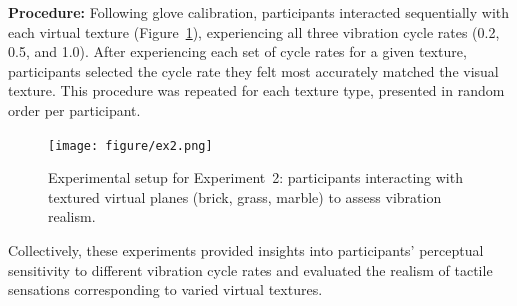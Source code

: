 \documentclass[graybox]{svmult}
\begin{document}
\textbf{Procedure:} Following glove calibration, participants interacted sequentially with each virtual texture (Figure~\ref{fig:experiment2_setup}), experiencing all three vibration cycle rates (0.2, 0.5, and 1.0). After experiencing each set of cycle rates for a given texture, participants selected the cycle rate they felt most accurately matched the visual texture. This procedure was repeated for each texture type, presented in random order per participant.

\begin{figure}\centering
	\texttt{[image: figure/ex2.png]}%
	\caption{Experimental setup for Experiment~2: participants interacting with textured virtual planes (brick, grass, marble) to assess vibration realism.}\label{fig:experiment2_setup}
\end{figure}

Collectively, these experiments provided insights into participants' perceptual sensitivity to different vibration cycle rates and evaluated the realism of tactile sensations corresponding to varied virtual textures.
\end{document}
